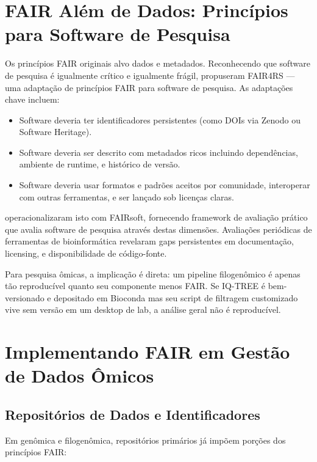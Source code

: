 \section{FAIR Além de Dados: Princípios para Software de Pesquisa}

Os princípios FAIR originais alvo dados e metadados. Reconhecendo que software de pesquisa é igualmente crítico e igualmente frágil, \textcite{barker2022} propuseram FAIR4RS --- uma adaptação de princípios FAIR para software de pesquisa. As adaptações chave incluem:

\begin{itemize}
\item Software deveria ter identificadores persistentes (como DOIs via Zenodo ou Software Heritage).
\item Software deveria ser descrito com metadados ricos incluindo dependências, ambiente de runtime, e histórico de versão.
\item Software deveria usar formatos e padrões aceitos por comunidade, interoperar com outras ferramentas, e ser lançado sob licenças claras.
\end{itemize}

\textcite{martindelico2024} operacionalizaram isto com FAIRsoft, fornecendo framework de avaliação prático que avalia software de pesquisa através destas dimensões. Avaliações periódicas de ferramentas de bioinformática revelaram gaps persistentes em documentação, licensing, e disponibilidade de código-fonte.

Para pesquisa ômicas, a implicação é direta: um pipeline filogenômico é apenas tão reproducível quanto seu componente menos FAIR. Se IQ-TREE é bem-versionado e depositado em Bioconda mas seu script de filtragem customizado vive sem versão em um desktop de lab, a análise geral não é reproducível.

\section{Implementando FAIR em Gestão de Dados Ômicos}

\subsection{Repositórios de Dados e Identificadores}

Em genômica e filogenômica, repositórios primários já impõem porções dos princípios FAIR:

